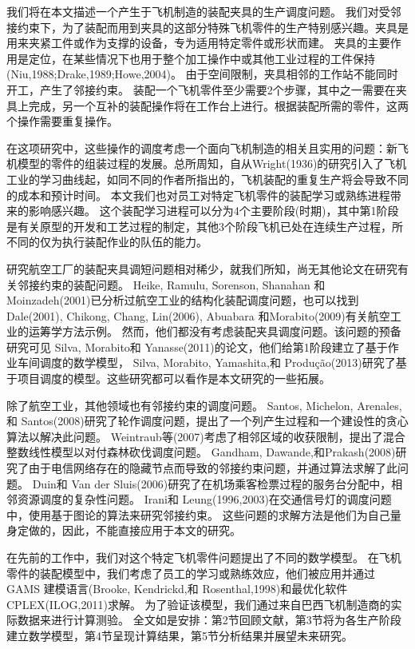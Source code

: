我们将在本文描述一个产生于飞机制造的装配夹具的生产调度问题。
我们对受邻接约束下，为了装配而用到夹具的这部分特殊飞机零件的生产特别感兴趣。夹具是用来夹紧工件或作为支撑的设备，专为适用特定零件或形状而建。
夹具的主要作用是定位，在某些情况下也用于整个加工操作中或其他工业过程的工件保持(Niu,1988;Drake,1989;Howe,2004)。
由于空间限制，夹具相邻的工作站不能同时开工，产生了邻接约束。
装配一个飞机零件至少需要2个步骤，其中之一需要在夹具上完成，另一个互补的装配操作将在工作台上进行。根据装配所需的零件，这两个操作需要重复操作。

在这项研究中，这些操作的调度考虑一个面向飞机制造的相关且实用的问题：新飞机模型的零件的组装过程的发展。总所周知，自从Wright(1936)的研究引入了飞机工业的学习曲线起，如同不同的作者所指出的，飞机装配的重复生产将会导致不同的成本和预计时间。
本文我们也对员工对特定飞机零件的装配学习或熟练进程带来的影响感兴趣。
这个装配学习进程可以分为4个主要阶段(时期)，其中第1阶段是有关原型的开发和工艺过程的制定，其他3个阶段飞机已处在连续生产过程，所不同的仅为执行装配作业的队伍的能力。

研究航空工厂的装配夹具调短问题相对稀少，就我们所知，尚无其他论文在研究有关邻接约束的装配问题。
Heike, Ramulu, Sorenson, Shanahan 和Moinzadeh(2001)已分析过航空工业的结构化装配调度问题，也可以找到 Dale(2001), Chikong, Chang, Lin(2006), Abuabara 和Morabito(2009)有关航空工业的运筹学方法示例。
然而，他们都没有考虑装配夹具调度问题。该问题的预备研究可见 Silva, Morabito和 Yanasse(2011)的论文，他们给第1阶段建立了基于作业车间调度的数学模型， Silva, Morabito, Yamashita,和 Produção(2013)研究了基于项目调度的模型。这些研究都可以看作是本文研究的一些拓展。

除了航空工业，其他领域也有邻接约束的调度问题。 Santos, Michelon, Arenales,和 Santos(2008)研究了轮作调度问题，提出了一个列产生过程和一个建设性的贪心算法以解决此问题。
Weintraub等(2007)考虑了相邻区域的收获限制，提出了混合整数线性模型以对付森林砍伐调度问题。
Gandham, Dawande,和Prakash(2008)研究了由于电信网络存在的隐藏节点而导致的邻接约束问题，并通过算法求解了此问题。
Duin和 Van der Sluis(2006)研究了在机场乘客检票过程的服务台分配中，相邻资源调度的复杂性问题。
Irani和 Leung(1996,2003)在交通信号灯的调度问题中，使用基于图论的算法来研究邻接约束。
这些问题的求解方法是他们为自己量身定做的，因此，不能直接应用于本文的研究。

在先前的工作中，我们对这个特定飞机零件问题提出了不同的数学模型。
在飞机零件的装配模型中，我们考虑了员工的学习或熟练效应，他们被应用并通过GAMS 建模语言(Brooke, Kendrickd,和 Rosenthal,1998)和最优化软件CPLEX(ILOG,2011)求解。
为了验证该模型，我们通过来自巴西飞机制造商的实际数据来进行计算测验。
全文如是安排：第2节回顾文献，第3节将为各生产阶段建立数学模型，第4节呈现计算结果，第5节分析结果并展望未来研究。

